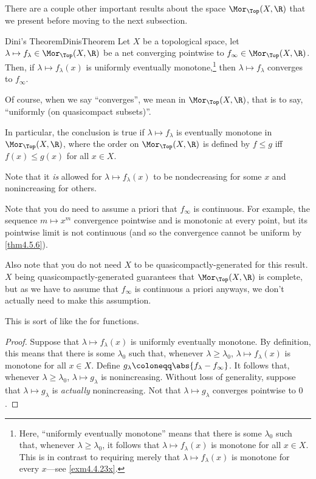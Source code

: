 There are a couple other important results about the space $\Mor _{\Top}(X,\R )$ that we present before moving to the next subsection.
\begin{prp}{Dini's Theorem}{DinisTheorem}
Let $X$ be a topological space, let $\lambda \mapsto f_{\lambda}\in \Mor _{\Top}(X,\R )$ be a net converging pointwise to $f_{\infty}\in \Mor _{\Top}(X,\R )$.  Then, if $\lambda \mapsto f_{\lambda}(x)$ is uniformly eventually monotone,\footnote{Here, ``uniformly eventually monotone'' means that there is some $\lambda _0$ such that, whenever $\lambda \geq \lambda _0$, it follows that $\lambda \mapsto f_{\lambda}(x)$ is monotone for all $x\in X$.  This is in contrast to requiring merely that $\lambda \mapsto f_{\lambda}(x)$ is monotone for every $x$---see \cref{exm4.4.23x}.} then $\lambda \mapsto f_{\lambda}$ converges to $f_{\infty}$.
\begin{rmk}
Of course, when we say ``converges'', we mean in $\Mor _{\Top}(X,\R )$, that is to say, ``uniformly (on quasicompact subsets)''.
\end{rmk}
\begin{rmk}
In particular, the conclusion is true if $\lambda \mapsto f_{\lambda}$ is eventually monotone in $\Mor _{\Top}(X,\R )$, where the order on $\Mor _{\Top}(X,\R )$ is defined by $f\leq g$ iff $f(x)\leq g(x)$ for all $x\in X$.
\end{rmk}
\begin{rmk}
Note that it \emph{is} allowed for $\lambda \mapsto f_{\lambda}(x)$ to be nondecreasing for some $x$ and nonincreasing for others.
\end{rmk}
\begin{rmk}
Note that you do need to assume a priori that $f_{\infty}$ is continuous.  For example, the sequence $m\mapsto x^m$ convergence pointwise and is monotonic at every point, but its pointwise limit is not continuous (and so the convergence cannot be uniform by \cref{thm4.5.6}).
\end{rmk}
\begin{rmk}
Also note that you do not need $X$ to be quasicompactly-generated for this result.  $X$ being quasicompactly-generated guarantees that $\Mor _{\Top}(X,\R )$ is complete, but as we have to assume that $f_{\infty}$ is continuous a priori anyways, we don't actually need to make this assumption.
\end{rmk}
\begin{rmk}
This is sort of like the  for functions.
\end{rmk}
\begin{proof}
Suppose that $\lambda \mapsto f_{\lambda}(x)$ is uniformly eventually monotone.  By definition, this means that there is some $\lambda _0$ such that, whenever $\lambda \geq \lambda _0$, $\lambda \mapsto f_{\lambda}(x)$ is monotone for all $x\in X$.  Define $g_{\lambda}\coloneqq \abs{f_{\lambda}-f_{\infty}}$.  It follows that, whenever $\lambda \geq \lambda _0$, $\lambda \mapsto g_{\lambda}$ is nonincreasing.  Without loss of generality, suppose that $\lambda \mapsto g_{\lambda}$ is \emph{actually} nonincreasing.  Not that $\lambda \mapsto g_{\lambda}$ converges pointwise to $0$.
 

\end{proof}
\end{prp}
